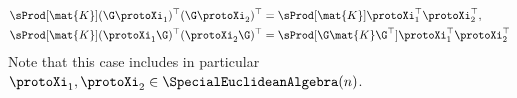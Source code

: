 {%
\begin{subequations}\label{eq:InnerProductSE3Translation}
\begin{align}
 \label{eq:InnerProductSE3LeftTranslation}
 \sProd[\mat{K}]{(\G \protoXi_1)^\top}{(\G \protoXi_2)^\top}
 &= \sProd[\mat{K}]{\protoXi_1^\top}{\protoXi_2^\top},
\\
 \label{eq:InnerProductSE3RightTranslation}
 \sProd[\mat{K}]{(\protoXi_1 \G)^\top}{(\protoXi_2 \G)^\top} 
 &= \sProd[\G \mat{K} \G^\top]{\protoXi_1^\top}{\protoXi_2^\top}
\end{align} 
\end{subequations}
Note that this case includes in particular $\protoXi_1, \protoXi_2 \in \SpecialEuclideanAlgebra(n)$.
}



